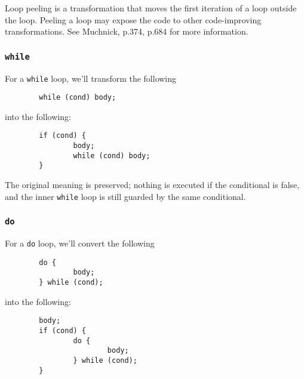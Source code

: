 \documentclass[10pt]{article}
\begin{document}
Loop peeling is a transformation that moves the first iteration of a loop 
outside the loop.  Peeling a loop may expose the code to other code-improving
transformations.  See Muchnick, p.374, p.684 for more information.


\subsubsection{{\tt while}}

For a {\tt while} loop, we'll transform the following

\begin{small}
\begin{verbatim}
        while (cond) body;
\end{verbatim}
\end{small}

\noindent
into the following:

\begin{small}
\begin{verbatim}
        if (cond) {
                body;
                while (cond) body;
        }
\end{verbatim}
\end{small}

\noindent
The original meaning is preserved; nothing is executed if the conditional
is false, and the inner {\tt while} loop is still guarded by the same
conditional.

\subsubsection{{\tt do}}

For a {\tt do} loop, we'll convert the following

\begin{small}
\begin{verbatim}
        do {
                body;
        } while (cond);
\end{verbatim}
\end{small}

\noindent
into the following:

\begin{small}
\begin{verbatim}
        body;
        if (cond) {
                do {
                        body;
                } while (cond);
        }
\end{verbatim}
\end{small}
\end{document}

